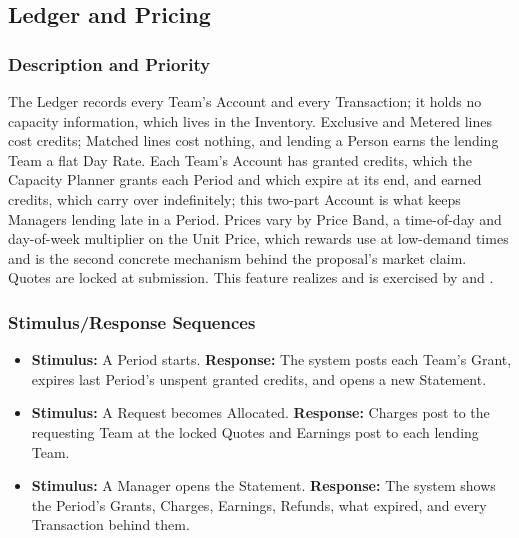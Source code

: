 \subsection{Ledger and Pricing}\label{feat:ledger}

\subsubsection{Description and Priority}
The Ledger records every Team's Account and every Transaction; it holds no capacity information, which lives in the Inventory. Exclusive and Metered lines cost credits; Matched lines cost nothing, and lending a Person earns the lending Team a flat Day Rate. Each Team's Account has granted credits, which the Capacity Planner grants each Period and which expire at its end, and earned credits, which carry over indefinitely; this two-part Account is what keeps Managers lending late in a Period. Prices vary by Price Band, a time-of-day and day-of-week multiplier on the Unit Price, which rewards use at low-demand times and is the second concrete mechanism behind the proposal's market claim. Quotes are locked at submission. This feature realizes  and is exercised by  and . 

\subsubsection{Stimulus/Response Sequences}
\begin{itemize}
  \item \textbf{Stimulus:} A Period starts. \textbf{Response:} The system posts each Team's Grant, expires last Period's unspent granted credits, and opens a new Statement.
  \item \textbf{Stimulus:} A Request becomes Allocated. \textbf{Response:} Charges post to the requesting Team at the locked Quotes and Earnings post to each lending Team.
  \item \textbf{Stimulus:} A Manager opens the Statement. \textbf{Response:} The system shows the Period's Grants, Charges, Earnings, Refunds, what expired, and every Transaction behind them.
\end{itemize}


